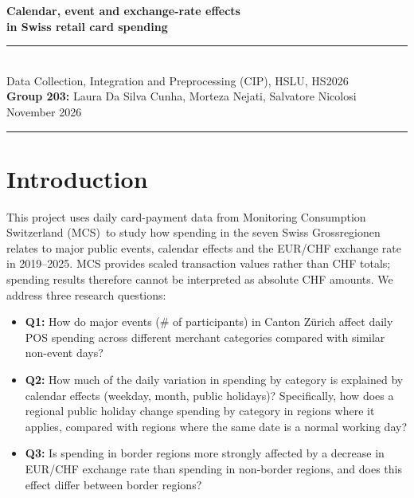 \documentclass[10pt]{article}
\let\plainsection\section
\renewcommand{\section}{\Needspace*{6\baselineskip}\plainsection}
\begin{document}
\color{charcoal}
\thispagestyle{empty}

\vspace*{21.3pt}
\begin{center}
{\fontsize{19}{23}\selectfont\bfseries\color{navy} Calendar, event and exchange-rate effects\\[1pt] in Swiss retail card spending}\\[17.7pt]
{\color{bluerule}\rule{0.18\textwidth}{0.8pt}}\\[16.7pt]
{\normalsize Data Collection, Integration and Preprocessing (CIP), HSLU, HS2026}\\[6.6pt]
{\normalsize \textbf{Group 203:} Laura Da Silva Cunha, Morteza Nejati, Salvatore Nicolosi}\\[6.6pt]
{\small\color{muted} November 2026}
\end{center}
\vspace{10.5pt}
{\color{bluerule}\rule{\textwidth}{0.4pt}}
\vspace{6.8pt}

\section{Introduction}
This project uses daily card-payment data from Monitoring Consumption Switzerland (MCS)\,\cite{mcs} to study how spending in the seven Swiss Grossregionen relates to major public events, calendar effects and the EUR/CHF exchange rate in 2019--2025. MCS provides scaled transaction values rather than CHF totals; spending results therefore cannot be interpreted as absolute CHF amounts. We address three research questions:
\begin{itemize}
\item \textbf{Q1:} How do major events (\# of participants) in Canton Zürich affect daily POS spending across different merchant categories compared with similar non-event days?
\item \textbf{Q2:} How much of the daily variation in spending by category is explained by calendar effects (weekday, month, public holidays)? Specifically, how does a regional public holiday change spending by category in regions where it applies, compared with regions where the same date is a normal working day?
\item \textbf{Q3:} Is spending in border regions more strongly affected by a decrease in EUR/CHF exchange rate than spending in non-border regions, and does this effect differ between border regions?
\end{itemize}
\end{document}
